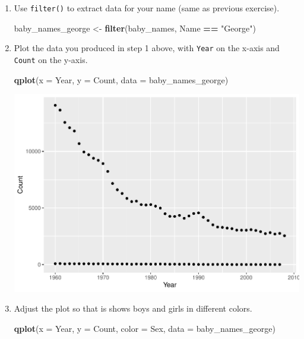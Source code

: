 \documentclass[
]{book}
\newenvironment{Shaded}{\begin{snugshade}}{\end{snugshade}}
\newcommand{\DataTypeTok}[1]{\textcolor[rgb]{0.13,0.29,0.53}{#1}}
\newcommand{\KeywordTok}[1]{\textcolor[rgb]{0.13,0.29,0.53}{\textbf{#1}}}
\newcommand{\NormalTok}[1]{#1}
\newcommand{\OperatorTok}[1]{\textcolor[rgb]{0.81,0.36,0.00}{\textbf{#1}}}
\newcommand{\StringTok}[1]{\textcolor[rgb]{0.31,0.60,0.02}{#1}}
\begin{document}
\begin{alert}

\begin{enumerate}
\def\labelenumi{\arabic{enumi}.}
\item
  Use \texttt{filter()} to extract data for your name (same as previous exercise).

\begin{Shaded}
\begin{Highlighting}[]
\NormalTok{baby\_names\_george \textless{}{-}}\StringTok{ }\KeywordTok{filter}\NormalTok{(baby\_names, Name }\OperatorTok{==}\StringTok{ "George"}\NormalTok{)}
\end{Highlighting}
\end{Shaded}
\item
  Plot the data you produced in step 1 above, with \texttt{Year} on the x-axis and \texttt{Count} on the y-axis.

\begin{Shaded}
\begin{Highlighting}[]
\KeywordTok{qplot}\NormalTok{(}\DataTypeTok{x =}\NormalTok{ Year, }\DataTypeTok{y =}\NormalTok{ Count, }\DataTypeTok{data =}\NormalTok{ baby\_names\_george)}
\end{Highlighting}
\end{Shaded}

  \includegraphics{R/Rintro/figures/unnamed-chunk-49-1.pdf}
\item
  Adjust the plot so that is shows boys and girls in different colors.

\begin{Shaded}
\begin{Highlighting}[]
\KeywordTok{qplot}\NormalTok{(}\DataTypeTok{x =}\NormalTok{ Year, }\DataTypeTok{y =}\NormalTok{ Count, }\DataTypeTok{color =}\NormalTok{ Sex, }\DataTypeTok{data =}\NormalTok{ baby\_names\_george)}
\end{Highlighting}
\end{Shaded}


\end{enumerate}
\end{alert}
\end{document}
